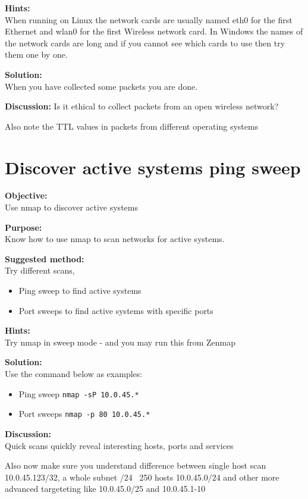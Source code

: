 \documentclass[a4paper,11pt,notitlepage]{report}
\begin{document}
{\bf Hints:}\\
When running on Linux the network cards are usually named eth0 for the first Ethernet and wlan0 for the first Wireless network card. In Windows the names of the network cards are long and if you cannot see which cards to use then try them one by one.

{\bf Solution:}\\
When you have collected some packets you are done.

{\bf Discussion:}
Is it ethical to collect packets from an open wireless network?

Also note the TTL values in packets from different operating systems


\chapter{Discover active systems ping sweep}
\label{ex:nmap-pingsweep}

{\bf Objective:}\\
Use nmap to discover active systems

{\bf Purpose:}\\
Know how to use nmap to scan networks for active systems.

{\bf Suggested method:}\\
Try different scans,
\begin{itemize}
\item Ping sweep to find active systems
\item Port sweeps to find active systems with specific ports
\end{itemize}

{\bf Hints:} \\
Try nmap in sweep mode - and you may run this from Zenmap

{\bf Solution:}\\
Use the command below as examples:
\begin{itemize}
\item Ping sweep \verb+nmap -sP 10.0.45.*+
\item Port sweeps \verb+nmap -p 80 10.0.45.*+
\end{itemize}

{\bf Discussion:}\\
Quick scans quickly reveal interesting hosts, ports and services

Also now make sure you understand difference between single host scan
10.0.45.123/32, a whole subnet /24 ~250 hosts 10.0.45.0/24 and other more advanced targeteting like 10.0.45.0/25 and 10.0.45.1-10
\end{document}
